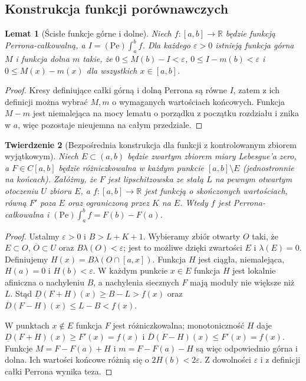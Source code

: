\documentclass[11pt,a4paper]{article}
\numberwithin{equation}{section}
\theoremstyle{plain}
\newtheorem{twierdzenie}{Twierdzenie}[section]
\newtheorem{lemat}[twierdzenie]{Lemat}
\theoremstyle{definition}
\theoremstyle{remark}
\newcommand{\R}{\mathbb R}
\newcommand{\Dn}{\underline D}
\newcommand{\Du}{\overline D}
\begin{document}
\subsection*{Konstrukcja funkcji porównawczych}
\begin{lemat}[Ścisłe funkcje górne i dolne]\label{lem:perron-scisle}
Niech $f:[a,b]\to\R$ będzie funkcją Perrona-całkowalną, a $I=(\mathrm{Pe})\int_a^b f$. Dla każdego $\varepsilon>0$ istnieją funkcja górna $M$ i funkcja dolna $m$ takie, że
$0\le M(b)-I<\varepsilon$, $0\le I-m(b)<\varepsilon$ i $0\le M(x)-m(x)$ dla wszystkich $x\in[a,b]$.
\end{lemat}
\begin{proof}
Kresy definiujące całki górną i dolną Perrona są równe $I$, zatem z ich definicji można wybrać $M,m$ o wymaganych wartościach końcowych. Funkcja $M-m$ jest niemalejąca na mocy lematu o porządku z początku rozdziału i znika w $a$, więc pozostaje nieujemna na całym przedziale.
\end{proof}
\begin{twierdzenie}[Bezpośrednia konstrukcja dla funkcji z kontrolowanym zbiorem wyjątkowym]\label{tw:perron-wyjatki}
Niech $E\subset(a,b)$ będzie zwartym zbiorem miary Lebesgue'a zero, a $F\in C[a,b]$ będzie różniczkowalna w każdym punkcie $[a,b]\setminus E$ (jednostronnie na końcach). Załóżmy, że $F$ jest lipschitzowska ze stałą $L$ na pewnym otwartym otoczeniu $U$ zbioru $E$, a $f:[a,b]\to\R$ jest funkcją o skończonych wartościach, równą $F'$ poza $E$ oraz ograniczoną przez $K$ na $E$. Wtedy $f$ jest Perrona-całkowalna i
$(\mathrm{Pe})\int_a^b f=F(b)-F(a)$.
\end{twierdzenie}
\begin{proof}
Ustalmy $\varepsilon>0$ i $B>L+K+1$. Wybieramy zbiór otwarty $O$ taki, że $E\subset O$, $\overline O\subset U$ oraz $B\lambda(O)<\varepsilon$; jest to możliwe dzięki zwartości $E$ i $\lambda(E)=0$. Definiujemy $H(x)=B\lambda(O\cap[a,x])$. Funkcja $H$ jest ciągła, niemalejąca, $H(a)=0$ i $H(b)<\varepsilon$. W każdym punkcie $x\in E$ funkcja $H$ jest lokalnie afiniczna o nachyleniu $B$, a nachylenia siecznych $F$ mają moduły nie większe niż $L$. Stąd $\Dn(F+H)(x)\ge B-L>f(x)$ oraz $\Du(F-H)(x)\le L-B<f(x)$.

W punktach $x\notin E$ funkcja $F$ jest różniczkowalna; monotoniczność $H$ daje $\Dn(F+H)(x)\ge F'(x)=f(x)$ i $\Du(F-H)(x)\le F'(x)=f(x)$. Funkcje $M=F-F(a)+H$ i $m=F-F(a)-H$ są więc odpowiednio górna i dolna. Ich wartości końcowe różnią się o $2H(b)<2\varepsilon$. Z dowolności $\varepsilon$ i z definicji całki Perrona wynika teza.
\end{proof}
\end{document}
